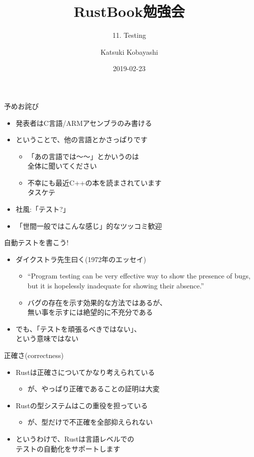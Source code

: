 \documentclass[cjk,14pt,xcolor=dvipsnames,table,dvipdfmx,professional font,t,fragile]{beamer}
\begin{document}
\title{RustBook勉強会}
\subtitle{11. Testing}
\author{Katsuki Kobayashi}
\date{2019-02-23}

\maketitle

\begin{frame}{予めお詫び}
 \begin{itemize}
  \item 発表者はC言語/ARMアセンブラのみ書ける
  \item ということで、他の言語とかさっぱりです
	\begin{itemize}
	 \item 「あの言語では〜〜」とかいうのは\\
	       全体に聞いてください
	 \item 不幸にも最近C++の本を読まされています\\
	       タスケテ
	\end{itemize}
  \item 社風:「テスト?」
  \item 「世間一般ではこんな感じ」的なツッコミ歓迎
 \end{itemize}
\end{frame}

\begin{frame}{自動テストを書こう!}
 \begin{itemize}
  \item ダイクストラ先生曰く(1972年のエッセイ)
	\begin{itemize}
	 \item 	{\scriptsize
		``Program testing can be very effective way to show the presence of bugs,
		but it is hopelessly inadequate for showing their absence.''}
	 \item バグの存在を示す効果的な方法ではあるが、\\
	       無い事を示すには絶望的に不充分である
	\end{itemize}
  \item でも、「テストを頑張るべきではない」、\\
	という意味ではない
 \end{itemize}
\end{frame}

\begin{frame}{正確さ(correctness)}
 \begin{itemize}
  \item Rustは正確さについてかなり考えられている
	\begin{itemize}
	 \item が、やっぱり正確であることの証明は大変
	\end{itemize}
  \item Rustの型システムはこの重役を担っている
	\begin{itemize}
	 \item が、型だけで不正確を全部抑えられない
	\end{itemize}
  \item というわけで、Rustは言語レベルでの\\
	テストの自動化をサポートします
 \end{itemize}
\end{frame}
\end{document}

